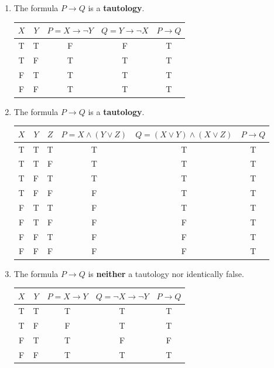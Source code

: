 \documentclass[12pt]{article}
\newcommand{\p}[1]{\item[\textnormal{(#1)}]}
\newenvironment{ps}
{\begin{enumerate}[leftmargin=0em, itemindent=1.5em]}
{\end{enumerate}}
\begin{document}
\begin{ps}
    \p{iv} The formula \(P \rightarrow Q\) is a \textbf{tautology}.

        \begin{center}
        \begin{tabular}{|c|c|c|c|c|}
        \hline
        $X$ & $Y$ & $P = X \rightarrow \neg Y$ & $Q = Y \rightarrow \neg X$ & $P \rightarrow Q$ \\
        \hline
        T & T & F & F & T \\
        T & F & T & T & T \\
        F & T & T & T & T \\
        F & F & T & T & T \\
        \hline
        \end{tabular}
        \end{center}

    \p{v} The formula \(P \rightarrow Q\) is a \textbf{tautology}.

        \begin{center}
        \begin{tabular}{|c|c|c|c|c|c|}
        \hline
        $X$ & $Y$ & $Z$ & $P = X \wedge (Y \vee Z)$ & $Q = (X \vee Y) \wedge (X \vee Z)$ & $P \rightarrow Q$ \\
        \hline
        T & T & T & T & T & T \\
        T & T & F & T & T & T \\
        T & F & T & T & T & T \\
        T & F & F & F & T & T \\
        F & T & T & F & T & T \\
        F & T & F & F & F & T \\
        F & F & T & F & F & T \\
        F & F & F & F & F & T \\
        \hline
        \end{tabular}
        \end{center}

    \p{vi} The formula \(P \rightarrow Q\) is \textbf{neither} a tautology nor identically
    false.

        \begin{center}
        \begin{tabular}{|c|c|c|c|c|}
        \hline
        $X$ & $Y$ & $P = X \rightarrow Y$ & $Q = \neg X \rightarrow \neg Y$ & $P \rightarrow Q$ \\
        \hline
        T & T & T & T & T \\
        T & F & F & T & T \\
        F & T & T & F & F \\
        F & F & T & T & T \\
        \hline
        \end{tabular}
        \end{center}


\end{ps}
\end{document}
